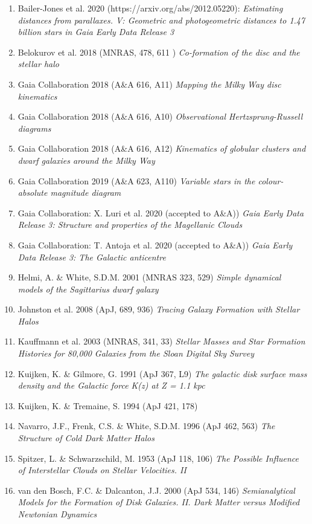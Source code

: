 \documentclass[10pt]{article}
\begin{document}
\begin{enumerate}
\item Bailer-Jones et al. 2020 (https://arxiv.org/abs/2012.05220):
 {\it Estimating distances from parallaxes. V: Geometric and photogeometric distances to 
1.47 billion stars in Gaia Early Data Release 3} 
\item Belokurov et al. 2018 (MNRAS, 478, 611 ) 
 {\it Co-formation of the disc and the stellar halo}  
\item Gaia Collaboration 2018 (A\&A 616, A11)
{\it Mapping the Milky Way disc kinematics}
\item Gaia Collaboration 2018 (A\&A 616, A10)
{\it Observational Hertzsprung-Russell diagrams}
\item Gaia Collaboration 2018 (A\&A 616, A12)
{\it Kinematics of globular clusters and dwarf galaxies around the Milky Way}
 \item Gaia Collaboration 2019 (A\&A 623, A110)
{\it Variable stars in the colour-absolute magnitude diagram}
\item  Gaia Collaboration: X. Luri et al. 2020 (accepted to A\&A))
{\it Gaia Early Data Release 3: Structure and properties of the Magellanic Clouds}
\item  Gaia Collaboration: T. Antoja et al. 2020 (accepted to A\&A))
{\it Gaia Early Data Release 3: The Galactic anticentre}
\item Helmi, A. \& White, S.D.M. 2001 (MNRAS 323, 529)
         {\it Simple dynamical models of the Sagittarius dwarf galaxy}
\item Johnston et al. 2008 (ApJ, 689, 936)
    {\it Tracing Galaxy Formation with Stellar Halos}
\item  Kauffmann et al. 2003 (MNRAS, 341, 33) 
   {\it Stellar Masses and Star Formation Histories for 80,000 Galaxies from the Sloan Digital Sky Survey} 
\item Kuijken, K. \& Gilmore, G. 1991 (ApJ 367, L9)  
     {\it The galactic disk surface mass density and the Galactic force K(z) at Z = 1.1 kpc}
\item Kuijken, K. \& Tremaine, S. 1994 (ApJ 421, 178)
\item Navarro, J.F., Frenk, C.S. \& White, S.D.M. 1996 (ApJ 462, 563) 
         {\it The Structure of Cold Dark Matter Halos}              
\item Spitzer, L. \& Schwarzschild, M. 1953 (ApJ 118, 106) 
           {\it The Possible Influence of Interstellar Clouds on Stellar Velocities. II}
\item van den Bosch, F.C. \& Dalcanton, J.J. 2000 (ApJ 534, 146)
         {\it Semianalytical Models for the Formation of 
               Disk Galaxies. II. Dark Matter versus Modified Newtonian Dynamics}
\end{enumerate}
\end{document}
